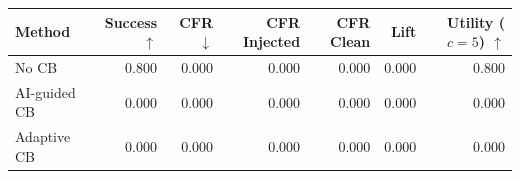 \begin{tabular}{lrrrrrr}
\toprule
Method & Success $\uparrow$ & CFR $\downarrow$ & CFR Injected & CFR Clean & Lift & Utility ($c=5$) $\uparrow$ \\
\midrule
No CB & 0.800 & 0.000 & 0.000 & 0.000 & 0.000 & 0.800 \\
AI-guided CB & 0.000 & 0.000 & 0.000 & 0.000 & 0.000 & 0.000 \\
Adaptive CB & 0.000 & 0.000 & 0.000 & 0.000 & 0.000 & 0.000 \\
\bottomrule
\end{tabular}
